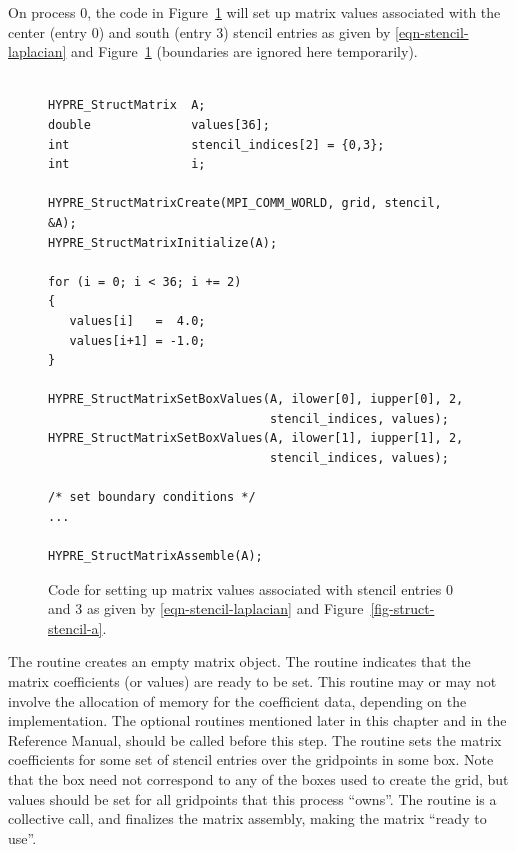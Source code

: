 On process 0, the code in Figure~\ref{fig-struct-matrix} will set up matrix
values associated with the center (entry 0) and south (entry 3) stencil entries
as given by \ref{eqn-stencil-laplacian} and Figure~\ref{fig-struct-matrix}
(boundaries are ignored here temporarily).
\begin{figure}
\centering
\begin{minipage}{0.75\textwidth}
\begin{verbatim}

HYPRE_StructMatrix  A;
double              values[36];
int                 stencil_indices[2] = {0,3};
int                 i;

HYPRE_StructMatrixCreate(MPI_COMM_WORLD, grid, stencil, &A);
HYPRE_StructMatrixInitialize(A);

for (i = 0; i < 36; i += 2)
{
   values[i]   =  4.0;
   values[i+1] = -1.0;
}

HYPRE_StructMatrixSetBoxValues(A, ilower[0], iupper[0], 2,
                               stencil_indices, values);
HYPRE_StructMatrixSetBoxValues(A, ilower[1], iupper[1], 2,
                               stencil_indices, values);

/* set boundary conditions */
...

HYPRE_StructMatrixAssemble(A);

\end{verbatim}
\end{minipage}
\caption{%
Code for setting up matrix values associated with stencil entries 0 and 3 as
given by \ref{eqn-stencil-laplacian} and Figure~\ref{fig-struct-stencil-a}.}
\label{fig-struct-matrix}
\end{figure}
The  routine creates an empty matrix object.  The
 routine indicates that the matrix coefficients (or values)
are ready to be set.  This routine may or may not involve the allocation of
memory for the coefficient data, depending on the implementation.  The optional
 routines mentioned later in this chapter and in the Reference
Manual, should be called before this step.  The  routine
sets the matrix coefficients for some set of stencil entries over the
gridpoints in some box.  Note that the box need not correspond to any of the
boxes used to create the grid, but values should be set for all gridpoints that
this process ``owns''.  The  routine is a collective call, and
finalizes the matrix assembly, making the matrix ``ready to use''.


